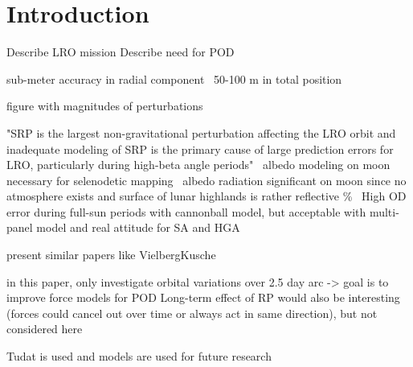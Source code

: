 \section{Introduction}

Describe LRO mission
Describe need for POD

sub-meter accuracy in radial component~\cite{Zuber2009}
50-100 m in total position~\cite{Chin2007}

figure with magnitudes of perturbations

"SRP is the largest non-gravitational perturbation affecting the LRO orbit and inadequate modeling of SRP is the primary cause of large prediction errors for LRO, particularly during high-beta angle periods"~\cite{Slojkowski2015}
albedo modeling on moon necessary for selenodetic mapping~\cite{Floberghagen1999}
albedo radiation significant on moon since no atmosphere exists and surface of lunar highlands is rather reflective \%~\cite{Floberghagen1999}
High OD error during full-sun periods with cannonball model, but acceptable with multi-panel model and real attitude for SA and HGA~\cite[]{Slojkowski2014}

present similar papers like VielbergKusche

in this paper, only investigate orbital variations over 2.5 day arc -> goal is to improve force models for POD
Long-term effect of RP would also be interesting (forces could cancel out over time or always act in same direction), but not considered here

Tudat is used and models are used for future research

